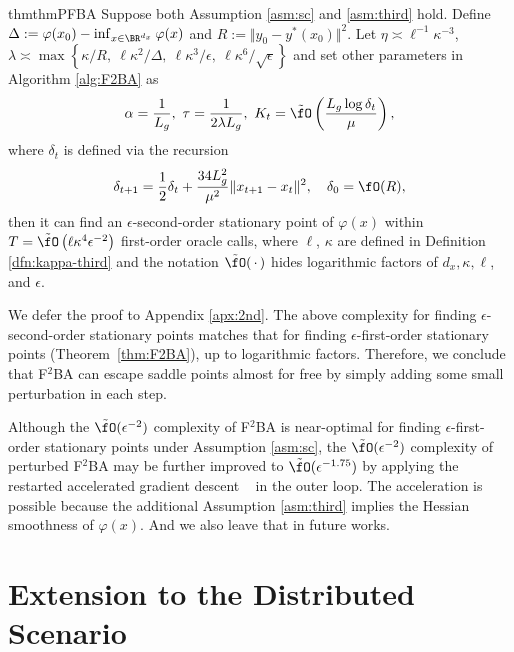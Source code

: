 \documentclass{article}
\begin{document}
\begin{restatable}{thm}{thmPFBA}\label{thm:PF2BA}
Suppose both Assumption \ref{asm:sc} and \ref{asm:third} hold.
Define $\Delta:=\varphi(x_0) - \inf_{x \in \BR^{d_x}} \varphi(x)$ and $R := \Vert y_0 - y^*(x_0) \Vert^2 $.
Let $\eta \asymp \ell^{-1} \kappa^{-3} $, $\lambda \asymp \max\left\{ \kappa/R,~\ell \kappa^2/ \Delta, ~ \ell \kappa^3 / \epsilon,~\ell \kappa^6 / \sqrt{\epsilon} \right\} $ and set other parameters 
in Algorithm \ref{alg:F2BA} as 
\begin{align*}
    \alpha = \frac{1}{L_g}, ~ \tau = \frac{1}{2 \lambda L_g},~ K_t = \tilde \fO\left(\frac{L_g  \log \delta_t}{\mu}   \right),
\end{align*}
where $\delta_t$ is defined via the recursion
\begin{align} \label{eq:delta-t}
    \delta_{t+1} = \frac{1}{2}\delta_t + \frac{34 L_g^2}{\mu^2}  \Vert x_{t+1} - x_t \Vert^2, \quad \delta_0 = \fO(R),
\end{align}
then 
it can find an $\epsilon$-second-order stationary point of $\varphi(x)$
within $ T = \tilde \fO\left(\ell \kappa^4 \epsilon^{-2} \right) $ first-order oracle calls, where $\ell$,  $\kappa$ are defined in Definition \ref{dfn:kappa-third} and the notation $\tilde \fO(\,\cdot\,)$ hides logarithmic factors of $d_x,\kappa,\ell$, and $\epsilon$.
\end{restatable}
We defer the proof to Appendix \ref{apx:2nd}.
The above complexity 
for finding $\epsilon$-second-order stationary points matches that  
for finding $\epsilon$-first-order stationary points (Theorem~\ref{thm:F2BA}), up to logarithmic factors. Therefore, we conclude that F${}^2$BA 
can escape saddle points almost for free by simply adding some small perturbation in each step.

\begin{rmk}
Although the $\tilde \fO(\epsilon^{-2})$ complexity of {F${}^2$BA} is near-optimal for finding $\epsilon$-first-order stationary points under Assumption \ref{asm:sc},  the $\tilde \fO(\epsilon^{-2})$ complexity of perturbed {F${}^2$BA} may be further improved to $\tilde \fO(\epsilon^{-1.75})$ by applying the restarted accelerated gradient descent ~\citep{li2022restarted,yang2023accelerating} in 
the outer loop.
The acceleration is possible because the additional Assumption \ref{asm:third} implies the Hessian smoothness of $\varphi(x)$. And we also leave that in future works.
\end{rmk}


\section{Extension to the Distributed Scenario} \label{sec:distributed}
\end{document}
